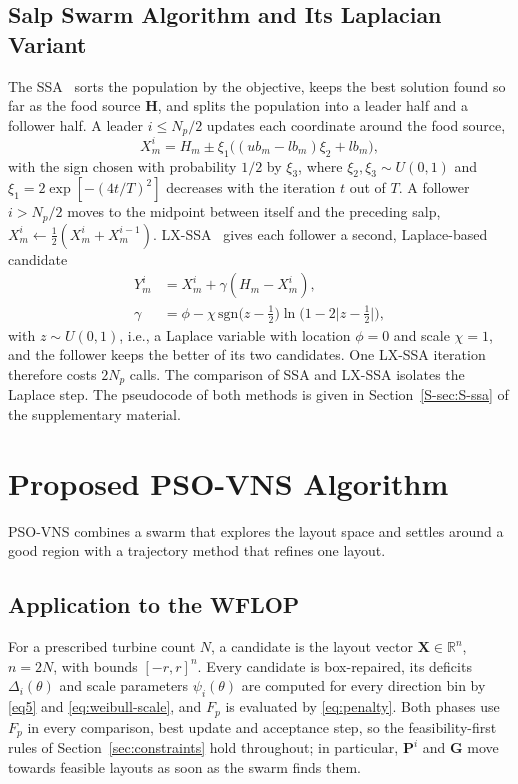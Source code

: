 \documentclass[journal,twoside]{IEEEtran}
\begin{document}
\subsection{Salp Swarm Algorithm and Its Laplacian Variant}
\label{sec:ssa}
The SSA~\cite{Mirjalili2017} sorts the population by the objective, keeps the best solution found so far as the food source $\mathbf H$, and splits the population into a leader half and a follower half. A leader $i\le N_p/2$ updates each coordinate around the food source,
\begin{equation}\label{eq:leader}
X_m^i = H_m\pm\xi_1\big((ub_m-lb_m)\xi_2+lb_m\big),
\end{equation}
with the sign chosen with probability $1/2$ by $\xi_3$, where $\xi_2,\xi_3\sim U(0,1)$ and $\xi_1=2\exp[-(4t/T)^2]$ decreases with the iteration $t$ out of $T$. A follower $i>N_p/2$ moves to the midpoint between itself and the preceding salp, $X_m^i\leftarrow\tfrac{1}{2}(X_m^i+X_m^{i-1})$. LX-SSA~\cite{Solanki2023} gives each follower a second, Laplace-based candidate~\cite{Deep2007}
\begin{align}
Y_m^i&=X_m^i+\gamma\left(H_m-X_m^i\right),\nonumber\\
\gamma&=\phi-\chi\,\mathrm{sgn}\bigl(z-\tfrac12\bigr)\ln\bigl(1-2\lvert z-\tfrac12\rvert\bigr),
\label{eq:laplace}
\end{align}
with $z\sim U(0,1)$, i.e., a Laplace variable with location $\phi=0$ and scale $\chi=1$, and the follower keeps the better of its two candidates. One LX-SSA iteration therefore costs $2N_p$ calls. The comparison of SSA and LX-SSA isolates the Laplace step. The pseudocode of both methods is given in Section~\ref{S-sec:S-ssa} of the supplementary material.

\section{Proposed PSO-VNS Algorithm}
\label{sec:hybrid}

PSO-VNS combines a swarm that explores the layout space and settles around a good region with a trajectory method that refines one layout.

\subsection{Application to the WFLOP}
For a prescribed turbine count $N$, a candidate is the layout vector $\mathbf X\in\mathbb R^{n}$, $n=2N$, with bounds $[-r,r]^{n}$. Every candidate is box-repaired, its deficits $\Delta_i(\theta)$ and scale parameters $\psi_i(\theta)$ are computed for every direction bin by \eqref{eq5} and \eqref{eq:weibull-scale}, and $F_p$ is evaluated by \eqref{eq:penalty}. Both phases use $F_p$ in every comparison, best update and acceptance step, so the feasibility-first rules of Section~\ref{sec:constraints} hold throughout; in particular, $\mathbf P^i$ and $\mathbf G$ move towards feasible layouts as soon as the swarm finds them.
\end{document}
